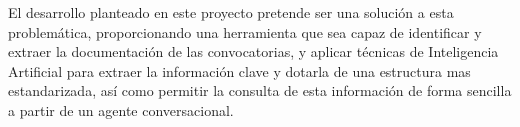 El desarrollo planteado en este proyecto pretende ser una solución a esta problemática, proporcionando una herramienta que sea capaz de identificar y extraer la documentación de las convocatorias, y aplicar técnicas de Inteligencia Artificial para extraer la información clave y dotarla de una estructura mas estandarizada, así como permitir la consulta de esta información de forma sencilla a partir de un agente conversacional.













